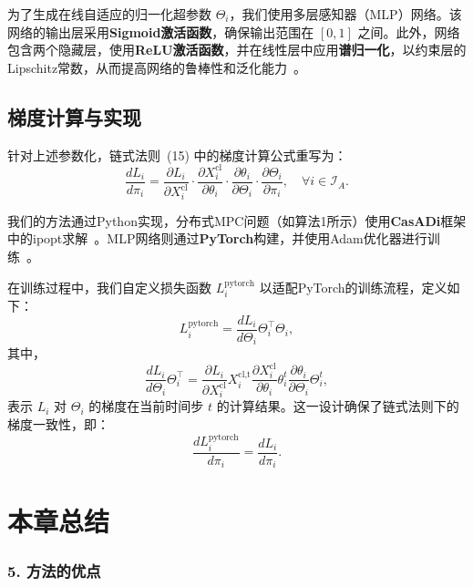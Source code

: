 \documentclass[lang=chs, degree=master, blindreview=false, winfonts=true]{yanputhesis}
\begin{document}
为了生成在线自适应的归一化超参数 \( \Theta_i \)，我们使用多层感知器（MLP）网络。该网络的输出层采用\textbf{Sigmoid激活函数}，确保输出范围在 \([0, 1]\) 之间。此外，网络包含两个隐藏层，使用\textbf{ReLU激活函数}，并在线性层中应用\textbf{谱归一化}，以约束层的Lipschitz常数，从而提高网络的鲁棒性和泛化能力~\cite{ref42}。

\subsection{梯度计算与实现}

针对上述参数化，链式法则~(15) 中的梯度计算公式重写为：
\begin{equation}
    \frac{d L_i}{d \pi_i} = \frac{\partial L_i}{\partial X_i^\text{cl}} \cdot \frac{\partial X_i^\text{cl}}{\partial \theta_i} \cdot \frac{\partial \theta_i}{\partial \Theta_i} \cdot \frac{\partial \Theta_i}{\partial \pi_i}, \quad \forall i \in \mathcal{I}_A.
\end{equation}

我们的方法通过Python实现，分布式MPC问题（如算法1所示）使用\textbf{CasADi}框架中的ipopt求解~\cite{ref43}。MLP网络则通过\textbf{PyTorch}构建，并使用Adam优化器进行训练~\cite{ref44, ref45}。

在训练过程中，我们自定义损失函数 \( L_i^\text{pytorch} \) 以适配PyTorch的训练流程，定义如下：
\begin{equation}
    L_i^\text{pytorch} = \frac{d L_i}{d \Theta_i} \Theta_i^\top \Theta_i,
\end{equation}
其中，
\begin{equation}
    \frac{d L_i}{d \Theta_i} \Theta_i^\top = \frac{\partial L_i}{\partial X_i^\text{cl}} X_i^\text{cl,t} \frac{\partial X_i^\text{cl}}{\partial \theta_i} \theta_i^t \frac{\partial \theta_i}{\partial \Theta_i} \Theta_i^t,
\end{equation}
表示 \( L_i \) 对 \( \Theta_i \) 的梯度在当前时间步 \( t \) 的计算结果。这一设计确保了链式法则下的梯度一致性，即：
\begin{equation}
    \frac{d L_i^\text{pytorch}}{d \pi_i} = \frac{d L_i}{d \pi_i}.
\end{equation}


\section{本章总结}
\subsubsection{5. 方法的优点}
\end{document}
